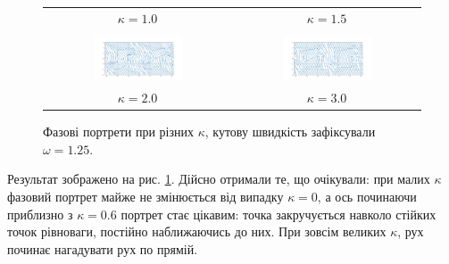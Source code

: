 \documentclass[oneside,solution]{tmpl}
\begin{document}
\begin{figure}
\begin{tabular}{cc}
  $\kappa=1.0$ & $\kappa=1.5$ \\[6pt] \\[6pt]
 \includegraphics[width=0.5\textwidth]{images/hw_4/phase_2.0.png} &   \includegraphics[width=0.5\textwidth]{images/hw_4/phase_3.0.png} \\
  $\kappa=2.0$ & $\kappa=3.0$ \\[6pt]
\end{tabular}
\caption{Фазові портрети при різних $\kappa$, кутову швидкість зафіксували $\omega=1.25$.}
\label{fig:phase}
\end{figure}

Результат зображено на рис. \ref{fig:phase}. Дійсно отримали те, що очікували: при малих $\kappa$ фазовий портрет майже не змінюється від випадку $\kappa=0$, а ось починаючи приблизно з $\kappa=0.6$ портрет стає цікавим: точка закручується навколо стійких точок рівноваги, постійно наближаючись до них. При зовсім великих $\kappa$, рух починає нагадувати рух по прямій.
\end{document}
